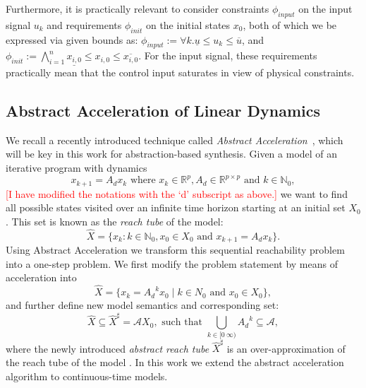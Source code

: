 \documentclass[twocolumn]{autart}    %
\newcommand{\mat}[1]{{#1}}
\renewcommand{\vec}[1]{{#1}}
\renewcommand{\note}[1]{\textcolor{red}{[#1]}}
\begin{document}
Furthermore, it is practically relevant to consider constraints $\phi_\mathit{input}$ on the input
signal $u_{k}$ and requirements $\phi_\mathit{init}$ on the initial states $x_0$, 
both of which we be expressed via given bounds as: 
$\phi_\mathit{input} := {\forall k.\underline{u} \leq u_{k} \leq \overline{u}} $, 
and $\phi_\mathit{init} := \bigwedge_{i=1}^{n} \underline{x_{i,0}} \leq x_{i,0} \leq \overline{x_{i,0}}$. 
For the input signal, these requirements practically mean that the control input saturates in view of physical constraints. 

\subsection{Abstract Acceleration of Linear Dynamics} 
\label{ssec:aa}
 
We recall a recently introduced technique called \emph{Abstract Acceleration}~\cite{JSS14,cattaruzza2015unbounded}, 
which will be key in this work for abstraction-based synthesis.  
Given a model of an iterative program with dynamics
%
\begin{equation}
\vec{x}_{k+1}=\mat{A_d}\vec{x}_k \text{ where } \vec{x}_k \in \mathbb{R}^p, \mat{A_d} \in \mathbb{R}^{p \times p} \text{ and } k \in \mathbb N_0,
\end{equation}
%
\textcolor{red}{[I have modified the notations with the `d' subscript as above.]}
we want to find all possible states visited over an infinite time horizon
starting at an initial set $X_0$.  
This set is known as the \emph{reach tube} of
the model:
%
\begin{equation}
\hat{X} = \{ \vec{x}_k: k \in \mathbb N_0, \vec{x}_0 \in X_0 \text{ and } \vec{x}_{k+1}=\mat{A_d}\vec{x}_k\}.
\end{equation}
%
Using Abstract Acceleration we transform this sequential reachability problem into a one-step problem.  
We first modify the problem statement by means of acceleration into
%
\begin{equation}
\hat{X} = \{ \vec{x}_k=\mat{A_d}^k\vec{x}_0 \mid k \in N_0 \text{ and } \vec{x}_0 \in X_0 \}, 
\end{equation}
%
and further define new model semantics and corresponding set: 
%
\begin{equation}\label{eq:aa_reachtube}
\hat{X} \subseteq \hat{X}^\sharp = \mathcal{A}X_0, \text{ such that } \bigcup_{k \in [0\ \infty)} \mat{A_d}^k \subseteq \mathcal{A}, 
\end{equation}
%
where the newly introduced \emph{abstract reach tube} $\hat{X}^\sharp$ is an
over-approximation of the reach tube of the model \cite{JSS14}.  
In this work we extend the abstract acceleration algorithm to continuous-time models. 
\end{document}
